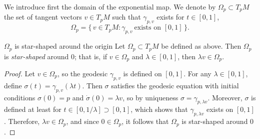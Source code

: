 We introduce first the domain of the exponential map. We denote by $\Omega_p \subset T_p M$ the set of tangent vectors $v \in T_p M$ such that $\gamma_{p,v}$ exists for $t\in [0,1]$,
\[
\Omega_p=\{\,v\in T_pM : \gamma_{p,v}\ \text{exists on }[0,1]\,\}.
\]

\begin{colorlem}{$\Omega_p$ is star-shaped around the origin}{}
Let \(\Omega_p \subset T_pM\) be defined as above. Then \(\Omega_p\) is \emph{star-shaped} around \(0\); that is, if \(v \in \Omega_p\) and \(\lambda \in [0,1]\), then \(\lambda v \in \Omega_p\).
\end{colorlem}


\begin{proof}
Let $v \in \Omega_p$, so the geodesic $\gamma_{p,v}$ is defined on $[0,1]$. For any $\lambda \in [0,1]$, define $\sigma(t) = \gamma_{p,v}(\lambda t)$. Then $\sigma$ satisfies the geodesic equation with initial conditions $\sigma(0) = p$ and $\dot{\sigma}(0) = \lambda v$, so by uniqueness $\sigma = \gamma_{p,\lambda v}$. Moreover, $\sigma$ is defined at least for $t \in [0,1/\lambda] \supset [0,1]$, which shows that $\gamma_{p,\lambda v}$ exists on $[0,1]$. Therefore, $\lambda v \in \Omega_p$, and since $0 \in \Omega_p$, it follows that $\Omega_p$ is star-shaped around $0$.
\end{proof}







